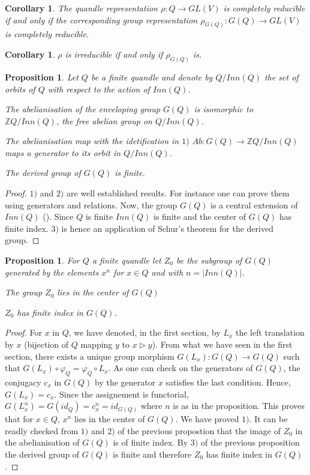 \documentclass[12pt, reqno]{amsart}
\newtheorem{proposition}[theorem]{Proposition}
\newtheorem{corollary}[theorem]{Corollary}
\begin{document}
\begin{corollary}\label{corred}
The quandle representation $\rho :Q\to GL(V)$ is completely reducible if and only if the corresponding group representation $\rho_{G(Q)} :G(Q) \to GL(V)$ is completely reducible.
\end{corollary}
\begin{corollary}
$\rho$ is irreducible if and only if $\rho_{G(Q)}$ is.
\end{corollary}


\begin{proposition} Let $Q$ be a finite quandle and denote by $Q/Inn(Q)$ the set of orbits of $Q$ with respect to the action of $Inn(Q)$.
\item[1)] The abelianisation of the enveloping group $G(Q)$ is isomorphic to $\mathbb{Z} Q/Inn(Q)$, the free abelian group on $Q/Inn(Q)$.
\item[2)] The abelianisation map with the idetification in $1)$ $Ab :G(Q)\to \mathbb{Z} Q/Inn(Q)$ maps a generator to its orbit in $Q/Inn(Q)$.
\item[3)] The derived group of $G(Q)$ is finite. 
\end{proposition}
\begin{proof}
$1)$ and $2)$ are well established results. For instance one can prove them using generators and relations. Now, the group $G(Q)$ is a central extension of $Inn(Q)$ (\cite{EM}). Since $Q$ is finite $Inn(Q)$ is finite and the center of $G(Q)$ has finite index. $3)$ is hence an application of Schur's theorem for the derived group.
\end{proof}

\begin{proposition}\label{Z0} For $Q$ a finite quandle let $Z_0$ be the subgroup of $G(Q)$ generated by the elements $x^n$ for $x\in Q$ and with $n=\vert Inn(Q) \vert $.
\item[1)] The group $Z_0$ lies in the center of $G(Q)$
\item[2)] $Z_0$ has finite index in $G(Q)$.
\end{proposition}
\begin{proof}
For $x$ in $Q$, we have denoted, in the first section, by $L_x$ the left translation by $x$ (bijection of $Q$ mapping $y$ to $x\triangleright y$). From what we have seen in the first section, there exists a unique group morphism $G(L_x):G(Q)\to G(Q)$ such that $G(L_x)\circ \varphi_Q=\varphi_Q \circ L_x$. As one can check on the generators of $G(Q)$, the conjugacy $c_x$ in $G(Q)$ by the generator $x$ satisfies the last condition. Hence, $G(L_x)=c_x$. Since the assignement is functorial, $G(L_x^n)=G(id_Q)=c_x^n=id_{G(Q)}$ where $n$ is as in the proposition. This proves that for $x\in Q$, $x^n$ lies in the center of $G(Q)$. We have proved $1)$. It can be readly checked from $1)$ and $2)$ of the previous propostion that the image of $Z_0$ in the abelianisation of $G(Q)$ is of finite index. By $3)$ of the previous proposition the derived group of $G(Q)$ is finite and therefore $Z_0$ has finite index in $G(Q)$.
\end{proof}
\end{document}
